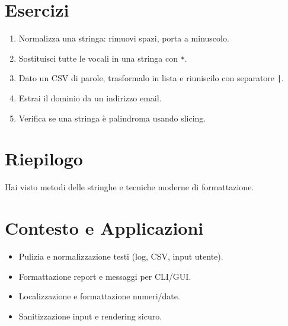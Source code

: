 \section{Esercizi}
\begin{enumerate}
  \item Normalizza una stringa: rimuovi spazi, porta a minuscolo.
  \item Sostituisci tutte le vocali in una stringa con \texttt{*}.
  \item Dato un CSV di parole, trasformalo in lista e riuniscilo con separatore \texttt{|}.
  \item Estrai il dominio da un indirizzo email.
  \item Verifica se una stringa è palindroma usando slicing.
\end{enumerate}

\section{Riepilogo}
Hai visto metodi delle stringhe e tecniche moderne di formattazione.

\section{Contesto e Applicazioni}
\begin{tcolorbox}[title=Contesto e Applicazioni]
\begin{itemize}
  \item Pulizia e normalizzazione testi (log, CSV, input utente).
  \item Formattazione report e messaggi per CLI/GUI.
  \item Localizzazione e formattazione numeri/date.
  \item Sanitizzazione input e rendering sicuro.
\end{itemize}
\end{tcolorbox}

